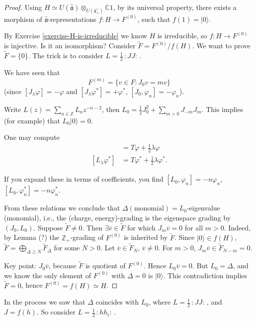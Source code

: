\begin{proof}
Using $H \simeq
U(\hat{\mathfrak{a}})\otimes_{U(\hat{\mathfrak{a}_+})}\mathbb{C}1$,
by its universal property, there exists a morphism of
 $\hat{\mathfrak{a}}$-representations
$f: H \to F^{(0)}$, such that $f(1)=|0\rangle$.

By Exercise \ref{exercise-H-is-irreducible}
we know $H$ is irreducible, so
$f:H \to F^{(0)}$ is injective.
Is it an isomorphism?
Consider  $\tilde{F}=F^{(0)}/f(H)$.
We want to prove $\tilde{F}=\{0\}$.
The trick is to consider  $L=\frac{1}{2}\,:\!J J\!:\,$.

We have seen that 
$$
F^{(m)}=\{v \in F: J_0v=mv\}
$$
(since $[J_\lambda \varphi]=-\varphi$ and
$[J_\lambda \varphi^*]=+\varphi^*$,
$[J_0,\varphi_n]=-\varphi_n$).

Write $L(z)=\sum_{n \in \mathbb{Z}}L_nz^{-n-2}$,
then $L_0=\frac{1}{2}J_0^2+\sum_{m>0}J_{-m}J_m$.
This implies (for example) that $L_0|0\rangle=0$.

One may compute
\begin{align*}
[L_\lambda \varphi]&=T\varphi+\frac{1}{2}\lambda\varphi\\
[L_\lambda\varphi^* ]&=T\varphi^* +\frac{1}{2}\lambda \varphi^*.
\end{align*}

\noindent
If you expand these in terms of coefficients,
you find
$[L_0,\varphi_n]=-n\varphi_n$,
$[L_0,\varphi_n^*]=-n\varphi_n^*$.

From these relations we conclude that
$\Delta(\text{monomial})=L_0$-eigenvalue
(monomial), i.e.,
the (charge, energy)-grading is the
eigenspace grading by $(J_0,L_0)$.
Suppose $\tilde{F}\neq 0$.
Then $\exists \overline{v} \in \tilde{F}$ for which
$J_m \overline{v}=0$ for all $m>0$.
Indeed, by Lemma (?) the  $\mathbb{Z}_+$-grading
of $F^{(0)}$ is inherited by $\tilde{F}$.
Since $|0\rangle \in f(H)$,
$\tilde{F}=\bigoplus_{\Delta \geq  N}\tilde{F}_{\Delta}$ 
for some $N>0$. Let $\overline{v} \in \tilde{F}_N$,
$\overline{v}\neq 0$.
For $m>0$, $J_m \overline{v} \in \tilde{F}_{N-m}=0$.

Key point: $J_0 \overline{v}$, because
$\tilde{F}$ is quotient of $F^{(0)}$.
Hence $L_0\overline{v}=0$.
But $L_0=\Delta$, and we know the only element of $F^{(0)}$ 
with $\Delta=0$ is $|0\rangle$.
This contradiction implies $\tilde{F}=0$,
hence $F^{(0)}=f(H) \simeq H$.
\end{proof}

In the process we saw that
$\Delta$ coincides with $L_0$,
where $L=\frac{1}{2}\,:\!J J\!:\,$,
and $J=f(h)$. So consider
$L=\frac{1}{2}\,:\!h h_i\!:\,$.

